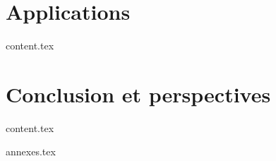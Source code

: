 \documentclass{bredele}
\begin{document}
\part{Applications}

\clearemptydoublepage
{content.tex}


\part{Conclusion et perspectives}


\clearemptydoublepage
{content.tex}



\clearemptydoublepage
\renewcommand{\thesubsection}{\Alph{chapter}}
{annexes.tex}


\clearemptydoublepage
\backmatter
\printbibliography

\tikzexternaldisable
\end{document}

